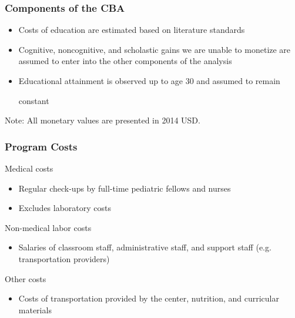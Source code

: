 \documentclass[static]{JJH-Beamer}
\begin{document}

\begin{frame}

\frametitle{Components of the CBA}

		

\begin{itemize}

\item Costs of education are estimated based on literature standards \citep[e.g.][]{Snyder_Willow_2012_BOOK_NCES}

\item Cognitive, noncognitive, and scholastic gains we are unable to monetize are assumed to enter into the other components of the analysis

\item Educational attainment is observed up to age 30 and assumed to remain

 constant

\end{itemize}

\end{frame}



Note: All monetary values are presented in 2014 USD.

\clearpage




\begin{frame}

\frametitle{Program Costs}


Medical costs

	\begin{itemize}

		\item Regular check-ups by full-time pediatric fellows and nurses

		\item Excludes laboratory costs 

	\end{itemize}

Non-medical labor costs

	\begin{itemize}

		\item Salaries of classroom staff, administrative staff, and support staff (e.g. transportation providers)

	\end{itemize}

Other costs

	\begin{itemize}

		\item Costs of transportation provided by the center, nutrition, and curricular materials

	\end{itemize}

\end{frame}
\end{document}
